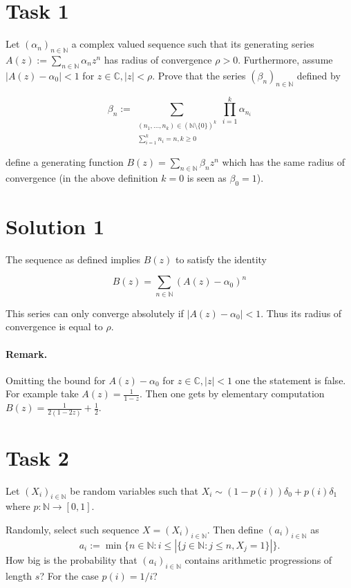 \documentclass[10pt,a4paper]{article}
\newcommand{\nats}{\mathbb{N}}
\newcommand{\complex}{\mathbb{C}}
\renewcommand{\to}{\rightarrow}
\begin{document}
\section{Task 1}

Let $(\alpha_n)_{n\in\nats}$ a complex valued sequence such that its generating series $A(z):=\sum_{n\in\nats}{\alpha_n z^n}$ has radius of convergence $\rho>0$. Furthermore, assume $|A(z)-\alpha_0|<1$ for $z\in\complex,|z|<\rho$. Prove that the series $(\beta_n)_{n\in\nats}$ defined by 

\begin{equation}
\beta_n:=\sum_{\substack{(n_1,\ldots,n_k)\in(\nats\setminus\{0\})^k\\ \sum_{i=1}^k{n_i}=n, k\geq 0}}{\prod_{i=1}^k{\alpha_{n_i}}}
\end{equation}

define a generating function $B(z)=\sum_{n\in\nats}{\beta_n z^n}$ which has the same radius of convergence (in the above definition $k=0$ is seen as $\beta_0=1$).

\section{Solution 1}

The sequence as defined implies $B(z)$ to satisfy the identity

\begin{equation}
B(z)=\sum_{n\in\nats}{(A(z)-\alpha_0)^n}
\end{equation}

This series can only converge absolutely if $|A(z)-\alpha_0|<1$. Thus its radius of convergence is equal to $\rho$.

\paragraph{Remark.} Omitting the bound for $A(z)-\alpha_0$ for $z\in\complex, |z|<1$ one the statement is false. For example take $A(z)=\frac{1}{1-z}$. Then one gets by elementary computation $B(z)=\frac{1}{2(1-2z)}+\frac{1}{2}$.

\section{Task 2}

Let $(X_i)_{i\in\nats}$ be random variables such that $X_i\sim(1-p(i))\delta_0+p(i)\delta_1$ where $p:\nats\to[0,1]$.

Randomly, select such sequence $X=(X_i)_{i\in\nats}$. Then define $(a_i)_{i\in\nats}$ as
\begin{equation}
a_i:=\min\{n\in\nats:i\leq|\{j\in\nats:j\leq n,X_j=1\}|\}\text{.}
\end{equation}
How big is the probability that $(a_i)_{i\in\nats}$ contains arithmetic progressions of length $s$? For the case $p(i)=1/i$?
\end{document}
